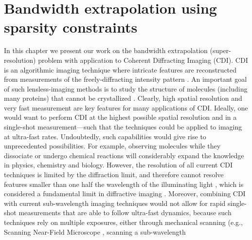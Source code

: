 \chapter{Bandwidth extrapolation using sparsity
  constraints\footnotemark\footnotemark}
\label{cha:bandw-extr-using}


In this chapter we present our work on the bandwidth extrapolation
(super-resolution) problem with application to Coherent Diffracting
Imaging (CDI). CDI is an algorithmic imaging technique where intricate
features are reconstructed from measurements of the freely-diffracting
intensity pattern 
. An important goal of such lensless-imaging methods
is to study the structure of molecules (including many proteins) that
cannot be crystallized
. Clearly,
high spatial resolution and very fast measurement are key features for
many applications of CDI. Ideally, one would want to perform CDI at
the highest possible spatial resolution and in a single-shot
measurement---such that the techniques could be applied to imaging at
ultra-fast rates. Undoubtedly, such capabilities would give rise to
unprecedented possibilities. For example, observing molecules while
they dissociate or undergo chemical reactions will considerably expand
the knowledge in physics, chemistry and biology. However, the
resolution of all current CDI techniques is limited by the diffraction
limit, and therefore cannot resolve features smaller than one half the
wavelength of the illuminating light , which is
considered a fundamental limit in diffractive imaging
. Moreover, combining CDI with current
sub-wavelength imaging techniques would not allow for rapid
single-shot measurements that are able to follow ultra-fast dynamics,
because such techniques rely on multiple exposures, either through
mechanical scanning (e.g., Scanning Near-Field Microscope
, scanning a sub-wavelength
